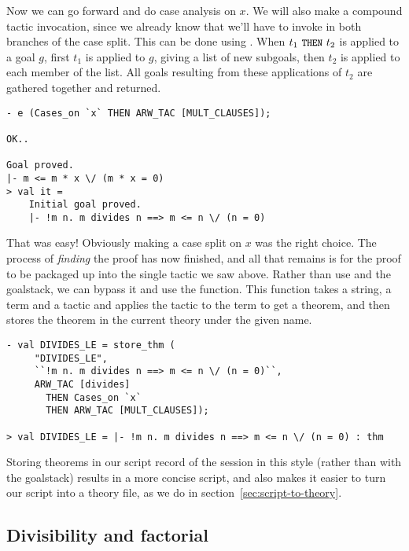 Now we can go forward and do case analysis on $x$. We will
    also make a compound tactic invocation, since we already know that
    we'll have to invoke  in both branches of the case
    split. This can be done using .  When $t_1 \
    \mbox{\ml{THEN}}\ t_2$ is applied to a goal $g$, first $t_1$ is
    applied to $g$, giving a list of new subgoals, then $t_2$ is
    applied to each member of the list. All goals resulting from these
    applications of $t_2$ are gathered together and returned.
\begin{session}\begin{verbatim}
- e (Cases_on `x` THEN ARW_TAC [MULT_CLAUSES]);

OK..

Goal proved.
|- m <= m * x \/ (m * x = 0)
> val it =
    Initial goal proved.
    |- !m n. m divides n ==> m <= n \/ (n = 0)
\end{verbatim}\end{session}
    That was easy! Obviously making a case split on $x$ was the right
    choice. The process of {\it finding\/} the proof has now finished,
    and all that remains is for the proof to be packaged up into the
    single tactic we saw above.  Rather than use \ml{top\_thm} and the
    goalstack, we can bypass it and use the \ml{store\_thm} function.
    This function takes a string, a term and a tactic and applies the
    tactic to the term to get a theorem, and then stores the theorem
    in the current theory under the given name.
\begin{session}\begin{verbatim}
- val DIVIDES_LE = store_thm (
     "DIVIDES_LE",
     ``!m n. m divides n ==> m <= n \/ (n = 0)``,
     ARW_TAC [divides]
       THEN Cases_on `x`
       THEN ARW_TAC [MULT_CLAUSES]);

> val DIVIDES_LE = |- !m n. m divides n ==> m <= n \/ (n = 0) : thm
\end{verbatim}\end{session}
    Storing theorems in our script record of the session in this style
    (rather than with the goalstack) results in a more concise script,
    and also makes it easier to turn our script into a theory file, as
    we do in section~\ref{sec:script-to-theory}.

\subsection{Divisibility and factorial}


